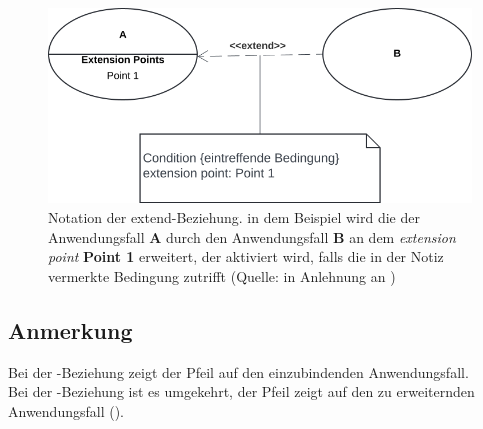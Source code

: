 \begin{figure}
    \centering
    \includegraphics[scale=0.4]{part three/Anwendungsfalldiagramm/img/usecase-extend}
    \caption{Notation der extend-Beziehung. in dem Beispiel wird die der Anwendungsfall \textbf{A} durch den Anwendungsfall \textbf{B} an dem \textit{extension point} \textbf{Point 1} erweitert, der aktiviert wird, falls die in der Notiz vermerkte Bedingung zutrifft (Quelle: in Anlehnung an \cite[65, Abb. 2.8-4]{Bal05})}
    \label{fig:usecase-extend}
\end{figure}

\subsection*{Anmerkung}
Bei der -Beziehung zeigt der Pfeil auf den einzubindenden Anwendungsfall.\\
Bei der -Beziehung ist es umgekehrt, der Pfeil zeigt auf den zu erweiternden Anwendungsfall (\cite[218]{Oes05}).